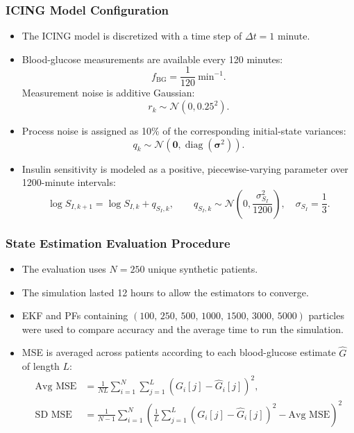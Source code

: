 \documentclass[aspectratio=43]{beamer}
\begin{document}
\begin{frame}
  \frametitle{ICING Model Configuration}

  \begin{itemize}
    \item The ICING model is discretized with a time step of
          $\Delta t = 1$ minute.

    \item Blood-glucose measurements are available every 120 minutes:
          \[
          f_{\mathrm{BG}}=\frac{1}{120}\ \mathrm{min}^{-1}.
          \]
          Measurement noise is additive Gaussian:
          \[
          r_k\sim\mathcal{N}(0,0.25^2).
          \]

    \item Process noise is assigned as 10\% of the corresponding
          initial-state variances:
          \[
          q_k\sim
          \mathcal{N}\!\left(
            \mathbf{0},\operatorname{diag}(\bm{\sigma}^2)
          \right).
          \]

    \item Insulin sensitivity is modeled as a positive, piecewise-varying
          parameter over 1200-minute intervals:
          \[
          \log S_{I,k+1}
          =
          \log S_{I,k}+q_{S_I,k},
          \qquad
          q_{S_I,k}\sim
          \mathcal{N}\!\left(
            0,\frac{\sigma_{S_I}^2}{1200}
          \right),
          \quad
          \sigma_{S_I}=\frac{1}{3}.
          \]
  \end{itemize}
\end{frame}

\begin{frame}
  \frametitle{State Estimation Evaluation Procedure}
    \begin{itemize}
      \item The evaluation uses $N=250$ unique synthetic patients.
      \item The simulation lasted 12 hours to allow the estimators to converge.
      \item EKF and PFs containing $\left(100,\,250,\,500,\,1000,\,1500, \,3000, \,5000\right)$ particles were used to compare accuracy and the average time to run the simulation.
      \item MSE is averaged across patients according to each blood-glucose estimate $\hat{G}$ of length $L$:
        \begin{align*}
          \text{Avg MSE} &= \frac{1}{N L} \sum_{i=1}^{N} \sum_{j=1}^{L} \left(G_i[j] - \hat{G}_i[j]\right)^2, \\
          \text{SD MSE} &= \frac{1}{N-1} \sum_{i=1}^{N} \left( \frac{1}{L}\sum_{j=1}^{L} \left(G_i[j] - \hat{G}_i[j]\right)^2 - \text{Avg MSE}\right)^2
        \end{align*}
    \end{itemize}
\end{frame}
\end{document}

